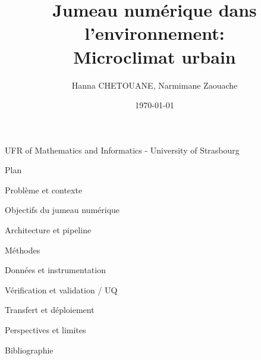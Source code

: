 \documentclass{beamer}
\author[Jumeau numérique: Environnement]{\large Hanna CHETOUANE, Narmimane Zaouache \\ \vspace{-0.8cm} \date{\today}}
\title[Microclimat urbain]{\textbf{Jumeau numérique dans l'environnement:} \\ Microclimat urbain}
\begin{document}
\begin{frame}
    \titlepage
    \vspace{-0.4cm}
    \begin{center}
        UFR of Mathematics and Informatics - University of Strasbourg 
        \\[0.2cm] 
    \end{center}
\end{frame} 


\begin{frame}{Plan}
    \tableofcontents    
\end{frame}


\begin{frame}{Problème et contexte}
    
\end{frame}


\begin{frame}{Objectifs du jumeau numérique}
    
\end{frame}


\begin{frame}{Architecture et pipeline}
\end{frame}


\begin{frame}{Méthodes}
    
\end{frame}


\begin{frame}{Données et instrumentation}
\end{frame}


\begin{frame}{Vérification et validation / UQ}
    
\end{frame}


\begin{frame}{Transfert et déploiement}
    
\end{frame}


\begin{frame}{Perspectives et limites}
    
\end{frame}


\begin{frame}{Bibliographie}
    
\end{frame}
\end{document}
